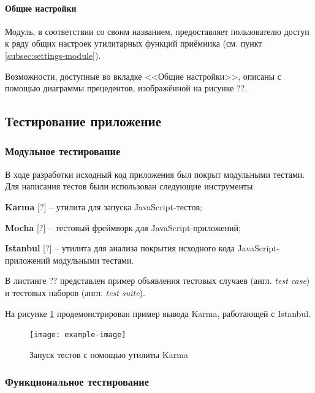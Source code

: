 \paragraph{Общие настройки}

Модуль, в соответствии со своим названием, предоставляет пользователю доступ к ряду общих настроек  утилитарных функций приёмника (см. пункт \ref{subsec:settings-module}).

Возможности, доступные во вкладке <<Общие настройки>>, описаны с помощью диаграммы прецедентов, изображённой на рисунке ??.



\subsection{Тестирование приложение}


\subsubsection{Модульное тестирование}

В ходе разработки исходный код приложения был покрыт модульными тестами. Для написания тестов были использован следующие инструменты:
\begin{dashitemize}
  \item \textbf{Karma} [?] -- утилита для запуска JavaScript-тестов;
  \item \textbf{Mocha} [?] -- тестовый фреймворк для JavaScript-приложений;
  \item \textbf{Istanbul} [?] -- утилита для анализа покрытия исходного кода JavaScript-приложений модульными тестами.
\end{dashitemize}

В листинге ?? представлен пример объявления тестовых случаев (англ. \emph{test case}) и тестовых наборов (англ. \emph{test suite}).

{\color{gray}{*listing*}}

На рисунке \ref{fig:karma-output} продемонстрирован пример вывода Karma, работающей с Istanbul.

\begin{figure}[h!]
  \centering
  \setlength{\fboxsep}{5pt}
  \texttt{[image: example-image]}
  \vspace*{6pt}
  \caption{Запуск тестов с помощью утилиты Karma}
  \label{fig:karma-output}
\end{figure}


\subsubsection{Функциональное тестирование}

